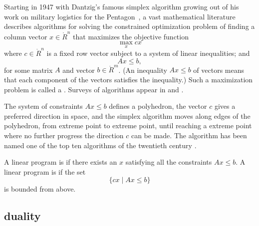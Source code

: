 Starting in 1947 with Dantzig's famous simplex algorithm growing out
of his work on military logistics for the Pentagon~\cite{Dan91}, a
vast mathematical literature describes algorithms for solving the
constrained optimization problem of finding a column vector
$x\in\ring{R}^n$ that maximizes the objective function
\begin{equation}\label{eqn:lp1}
\max_{x}  c x
\end{equation}
where $c\in\ring{R}^n$ is a fixed row vector subject to a system of
linear inequalities; and
\begin{equation}\label{eqn:lp2}
A x\le b,
\end{equation} 
for some matrix $A$ and vector $b\in \ring{R}^m$.  (An inequality $A
x\le b$ of vectors means that each component of the vectors satisfies
the inequality.)  Such a maximization problem is called a
.  Surveys of algorithms appear in
\cite{Wri05} and \cite{Tod02}.  

The system of constraints $A x \le b$ defines a
polyhedron, the vector $c$ gives a preferred direction in space, and
the simplex algorithm moves along edges of the polyhedron, from extreme
point to extreme point, until reaching a extreme point where no
further progress the direction $c$ can be made.  The algorithm has been named one
of the top ten algorithms of the twentieth century \cite{Cip00}.


A linear program is  if there exists an $x$ satisfying
all the constraints $A x \le b$.  A linear program is 
if the set 
\[
\{c x \mid A x \le b\}
\]
is bounded from above.

\subsection{duality}

